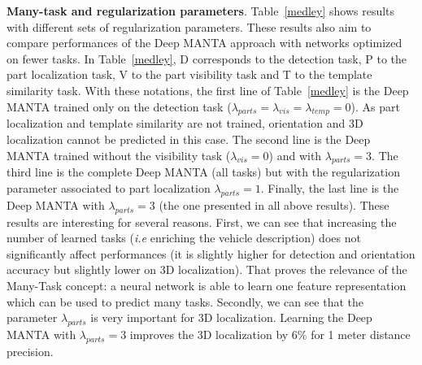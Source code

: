 \documentclass[10pt,twocolumn,letterpaper]{article}
\begin{document}
\textbf{Many-task and regularization parameters}. Table~\ref{medley} shows results with different sets of regularization parameters. These results also aim to compare performances of the Deep MANTA approach with networks optimized on fewer tasks. In Table~\ref{medley}, D corresponds to the detection task, P to the part localization task, V to the part visibility task and T to the template similarity task. With these notations, the first line of Table~\ref{medley} is the Deep MANTA trained only on the detection task ($\lambda_{parts} = \lambda_{vis} = \lambda_{temp} = 0$). As part localization and template similarity are not trained, orientation and 3D localization cannot be predicted in this case. The second line is the Deep MANTA trained without the visibility task ($\lambda_{vis} = 0$) and with $\lambda_{parts} = 3$. The third line is the complete Deep MANTA (all tasks) but with the regularization parameter associated to part localization $\lambda_{parts} = 1$. Finally, the last line is the Deep MANTA with $\lambda_{parts} = 3$ (the one presented in all above results). These results are interesting for several reasons. First, we can see that increasing the number of learned tasks (\textit{i.e} enriching the vehicle description) does not significantly affect performances (it is slightly higher for detection and orientation accuracy but slightly lower on 3D localization). That proves the relevance of the Many-Task concept: a neural network is able to learn one feature representation which can be used to predict many tasks. Secondly, we can see that the parameter $\lambda_{parts}$ is very important for 3D localization. Learning the Deep MANTA with $\lambda_{parts} = 3$ improves the 3D localization by  6\% for 1 meter distance precision.       
\end{document}
